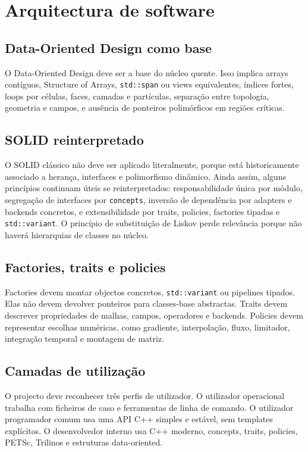 \documentclass[11pt,a4paper]{article}
\begin{document}
\section{Arquitectura de software}

\subsection{Data-Oriented Design como base}

O Data-Oriented Design deve ser a base do núcleo quente. Isso implica arrays contíguos, Structure of Arrays, \texttt{std::span} ou views equivalentes, índices fortes, loops por células, faces, camadas e partículas, separação entre topologia, geometria e campos, e ausência de ponteiros polimórficos em regiões críticas.

\subsection{SOLID reinterpretado}

O SOLID clássico não deve ser aplicado literalmente, porque está historicamente associado a herança, interfaces e polimorfismo dinâmico. Ainda assim, alguns princípios continuam úteis se reinterpretados: responsabilidade única por módulo, segregação de interfaces por \texttt{concepts}, inversão de dependência por adapters e backends concretos, e extensibilidade por traits, policies, factories tipadas e \texttt{std::variant}. O princípio de substituição de Liskov perde relevância porque não haverá hierarquias de classes no núcleo.

\subsection{Factories, traits e policies}

Factories devem montar objectos concretos, \texttt{std::variant} ou pipelines tipados. Elas não devem devolver ponteiros para classes-base abstractas. Traits devem descrever propriedades de malhas, campos, operadores e backends. Policies devem representar escolhas numéricas, como gradiente, interpolação, fluxo, limitador, integração temporal e montagem de matriz.

\subsection{Camadas de utilização}

O projecto deve reconhecer três perfis de utilizador. O utilizador operacional trabalha com ficheiros de caso e ferramentas de linha de comando. O utilizador programador comum usa uma API C++ simples e estável, sem templates explícitos. O desenvolvedor interno usa C++ moderno, concepts, traits, policies, PETSc, Trilinos e estruturas data-oriented.
\end{document}
